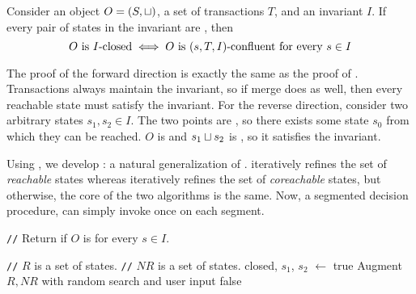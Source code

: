 \begin{theorem}
  Consider an object $O = (S, \sqcup)$, a set of transactions $T$, and an
  invariant $I$. If every pair of states in the invariant are \TIcoreachable{},
  then
  \[
    \text{$O$ is $I$-closed{}}
    \iff
    \text{$O$ is $(s, T, I)$-confluent for every $s \in I$}
  \]
\end{theorem}

The proof of the forward direction is exactly the same as the proof of
. Transactions always maintain the
invariant, so if merge does as well, then every reachable state must satisfy
the invariant.
%
For the reverse direction, consider two arbitrary states $s_1, s_2 \in I$.
The two points are \TIcoreachable{}, so there exists some state $s_0$ from
which they can be reached. $O$ is \sTIconfluent{} and $s_1 \sqcup s_2$ is
\sTIreachable{}, so it satisfies the invariant.

Using , we develop
: a natural generalization
of .
 iteratively refines the set of
\emph{reachable} states whereas
 iteratively refines the
set of \emph{coreachable} states, but otherwise, the core of the two algorithms
is the same. Now, a segmented \invariantconfluence{} decision procedure, can
simply invoke  once on each
segment.

\newcommand{\algocomment}[1]{\State \textcolor{flatdenim}{\texttt{//} #1}}
\begin{algorithm}[t]
  \caption{%
    Interactive \invariantconfluence{} decision procedure for arbitrary start
    state $s \in I$
  }%
  \begin{algorithmic}
    \algocomment{Return if $O$ is  for every $s \in I$.}
      \State \Return {}
    \EndFunction

    \State

    \algocomment{$R$ is a set of \TIcoreachable{} states.}
    \algocomment{$NR$ is a set of \TIcounreachable{} states.}
      \State closed, $s_1$, $s_2$ $\gets$ 
        \Return true
      \EndIf
      \State Augment $R, NR$ with random search and user input
        \Return false
      \EndIf
      \State \Return {}
    \EndFunction
  \end{algorithmic}
\end{algorithm}

